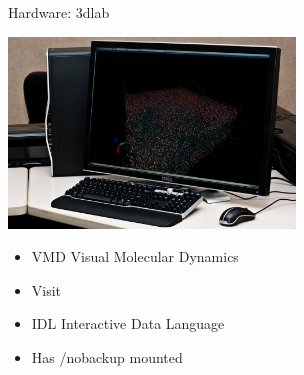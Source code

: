 \documentclass[handout]{beamer}
\begin{document}
\begin{frame}{Hardware: 3dlab}
 \begin{center}\includegraphics[height=2.0in]{3dlab}\end{center}
  \begin{itemize}
   \item VMD Visual Molecular Dynamics
   \item Visit
   \item IDL Interactive Data Language
   \item Has /nobackup mounted
  \end{itemize}
\end{frame}
\end{document}
